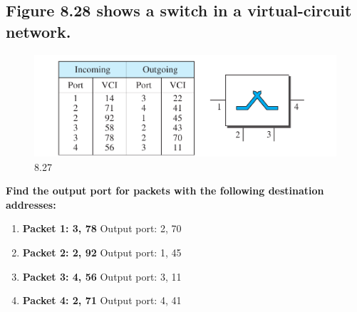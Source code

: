 \documentclass{article}
\begin{document}
\subsection{Figure 8.28 shows a switch in a virtual-circuit network.}

\begin{figure}[H]
	\center
	\includegraphics[scale=0.5]{8.28.png}
	\caption{8.27}
\end{figure}
\textbf{Find the output port for packets with the following destination addresses:}
\begin{enumerate}
	\item \textbf{ Packet 1: 3, 78 } Output port: 2, 70
	\item \textbf{ Packet 2: 2, 92 } Output port: 1, 45
	\item \textbf{ Packet 3: 4, 56 } Output port: 3, 11
	\item \textbf{ Packet 4: 2, 71 } Output port: 4, 41
\end{enumerate}
\end{document}
